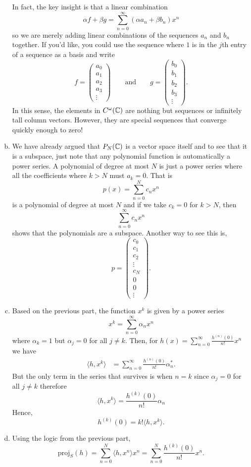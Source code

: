 \documentclass[12pt]{article} %
\begin{document}
\begin{problem}
\begin{solution}
\begin{enumerate}[(a)]
\[    \]
    In fact, the key insight is that a linear combination
    \[
    \alpha f+ \beta g = \sum_{n=0}^\infty (\alpha a_n + \beta b_n)x^n
    \]
    so we are merely adding linear combinations of the sequences $a_n$ and $b_n$ together. If you'd like, you could use the sequence where $1$ is in the $j$th entry of a sequence as a basis and write
    \[
    f = \begin{pmatrix} a_0 \\ a_1 \\ a_2 \\ a_3 \\ \vdots \end{pmatrix} \qquad \textrm{and} \qquad g = \begin{pmatrix} b_0 \\ b_1 \\ b_2 \\ b_3 \\ \vdots \end{pmatrix}.
    \]
    In this sense, the elements in $C^\omega(\mathbb{C})$ are nothing but sequences or infinitely tall column vectors. However, they are special sequences that converge quickly enough to zero!
    \item We have already argued that $P_N(\mathbb{C})$ is a vector space itself and to see that it is a subspace, just note that any polynomial function is automatically a power series. A polynomial of degree at most $N$ is just a power series where all the coefficients where $k>N$ must $a_{k}=0$. That is
    \[
    p(x) = \sum_{n=0}^N c_n x^n
    \]
    is a polynomial of degree at most $N$ and if we take $c_k=0$ for $k>N$, then
    \[
    \sum_{n=0}^\infty c_n x^n
    \]
    shows that the polynomials are a subspace. Another way to see this is,
    \[
    p = \begin{pmatrix} c_0 \\ c_1 \\ c_2 \\ \vdots \\ c_N \\ 0 \\ 0 \\ \vdots \end{pmatrix}.
    \]
    \item Based on the previous part, the function $x^k$ is given by a power series
    \[
    x^k = \sum_{n=0}^\infty \alpha_n x^n
    \]
    where $\alpha_k =1$ but $\alpha_j=0$ for all $j\neq k$. Then, for $h(x) = \sum_{n=0}^\infty \frac{h^{(n)}(0)}{n!}x^n$ we have
    \begin{align*}
        \langle h, x^k \rangle &= \sum_{n=0}^\infty \frac{h^{(n)}(0)}{n!}\alpha_n^*.
    \end{align*}
    But the only term in the series that survives is when $n=k$ since $\alpha_j=0$ for all $j\neq k$ therefore
    \[
    \langle h, x^k \rangle = \frac{h^{(k)}(0)}{n!}\alpha_n
    \]
    Hence,
    \[
h^{(k)}(0) = k!\langle h,x^k \rangle.
    \]
\item Using the logic from the previous part,
\[
\textrm{proj}_S(h) = \sum_{n=0}^N \langle h, x^n \rangle  x^n = \sum_{n=0}^N \frac{h^{(k)}(0)}{n!}x^n.
\]


\end{enumerate}
\end{solution}
\end{problem}
\end{document}
